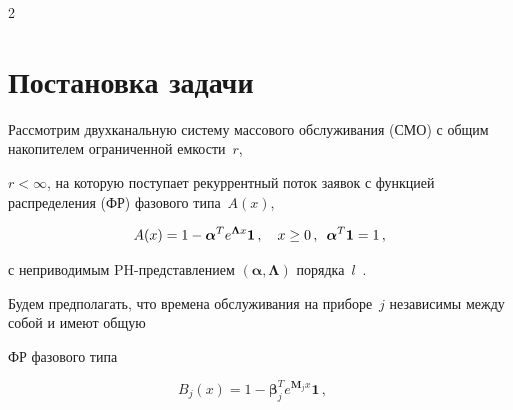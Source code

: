 













      \thispagestyle{headings}



      \begin{multicols}{2}



      \label{st\stat}



\section{Постановка задачи}



Рассмотрим двухканальную систему массового обслуживания (СМО) с общим накопителем ограниченной емкости~$r$, 

$r<\infty$, на которую поступает рекуррентный поток заявок с функцией распределения (ФР) фазового типа~$A(x)$,

\begin{equation*}

A(x)=1-\boldsymbol{\alpha}^T e^{\boldsymbol{\Lambda}x}\mathbf{1}\,, \quad

x\geq 0\,,\enskip \boldsymbol{\alpha}^T\mathbf{1}=1\,,

\end{equation*}

с неприводимым PH-представлением $(\boldsymbol{\alpha},\boldsymbol{\Lambda})$ порядка~$l$~\cite{1mat}.



Будем предполагать, что времена обслуживания на приборе~$j$ независимы  между собой и имеют общую 

ФР фазового типа

\begin{equation*}

B_j(x)=1-\boldsymbol{\beta}_j^T e^{\boldsymbol{M}_j x}\mathbf{1}\,, \quad


\end{equation*}
\end{multicols}
